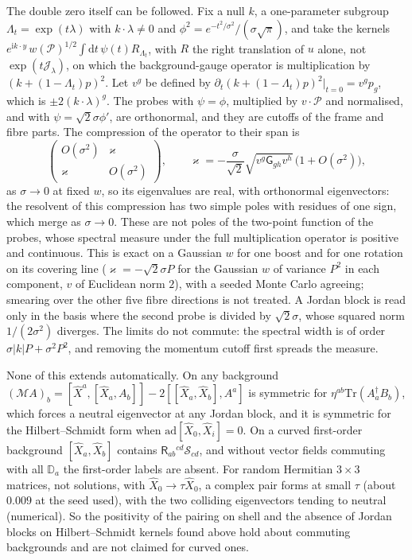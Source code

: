 The double zero itself can be followed. Fix a null \(k\), a one-parameter subgroup \(\Lambda_t=\exp(t\lambda)\) with \(k\cdot\lambda\neq0\) and \(\phi^2=e^{-t^2/\sigma^2}/(\sigma\sqrt\pi)\), and take the kernels \(e^{\mathrm ik\cdot y}\,w(\mathcal P)^{1/2}\int\mathrm dt\,\psi(t)R_{\Lambda_t}\), with \(R\) the right translation of \(u\) alone, not \(\exp(t\mathcal J_\lambda)\), on which the background-gauge operator is multiplication by \((k+(1-\Lambda_t)p)^2\). Let \(v^g\) be defined by \(\partial_t(k+(1-\Lambda_t)p)^2|_{t=0}=v^gp_g\), which is \(\pm2(k\cdot\lambda)^g\). The probes with \(\psi=\phi\), multiplied by \(v\cdot\mathcal P\) and normalised, and with \(\psi=\sqrt2\sigma\phi'\), are orthonormal, and they are cutoffs of the frame and fibre parts. The compression of the operator to their span is
\[
\begin{pmatrix}O(\sigma^2)&\varkappa\\\varkappa&O(\sigma^2)\end{pmatrix},\qquad
\varkappa=-\frac{\sigma}{\sqrt2}\sqrt{v^g\mathsf G_{gh}v^h}\,\bigl(1+O(\sigma^2)\bigr),
\]
as \(\sigma\to0\) at fixed \(w\), so its eigenvalues are real, with orthonormal eigenvectors: the resolvent of this compression has two simple poles with residues of one sign, which merge as \(\sigma\to0\). These are not poles of the two-point function of the probes, whose spectral measure under the full multiplication operator is positive and continuous. This is exact on a Gaussian \(w\) for one boost and for one rotation on its covering line (\(\varkappa=-\sqrt2\sigma P\) for the Gaussian \(w\) of variance \(P^2\) in each component, \(v\) of Euclidean norm \(2\)), with a seeded Monte Carlo agreeing; smearing over the other five fibre directions is not treated. A Jordan block is read only in the basis where the second probe is divided by \(\sqrt2\sigma\), whose squared norm \(1/(2\sigma^2)\) diverges. The limits do not commute: the spectral width is of order \(\sigma|k|P+\sigma^2P^2\), and removing the momentum cutoff first spreads the measure.

None of this extends automatically. On any background \((\mathcal MA)_b=[\hat X^a,[\hat X_a,A_b]]-2[[\hat X_a,\hat X_b],A^a]\) is symmetric for \(\eta^{ab}\mathrm{Tr}(A_a^\dagger B_b)\), which forces a neutral eigenvector at any Jordan block, and it is symmetric for the Hilbert--Schmidt form when \(\mathrm{ad}[\hat X_0,\hat X_i]=0\). On a curved first-order background \([\hat X_a,\hat X_b]\) contains \(\mathsf R_{ab}{}^{cd}\mathcal S_{cd}\), and without vector fields commuting with all \(\mathbb D_a\) the first-order labels are absent. For random Hermitian \(3\times3\) matrices, not solutions, with \(\hat X_0\to\tau\hat X_0\), a complex pair forms at small \(\tau\) (about \(0.009\) at the seed used), with the two colliding eigenvectors tending to neutral (numerical). So the positivity of the pairing on shell and the absence of Jordan blocks on Hilbert--Schmidt kernels found above hold about commuting backgrounds and are not claimed for curved ones.

